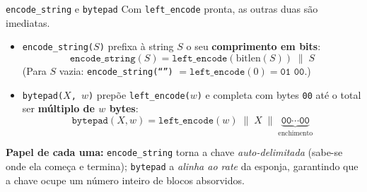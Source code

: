 \documentclass{beamer}
\begin{document}
\begin{frame}{\texttt{encode\_string} e \texttt{bytepad}}
    Com \texttt{left\_encode} pronta, as outras duas são imediatas.
    \medskip
    \begin{itemize}
        \footnotesize
        \item \texttt{encode\_string($S$)} prefixa à string $S$ o seu \textbf{comprimento em bits}:
        \[
            \texttt{encode\_string}(S) = \texttt{left\_encode}(\text{bitlen}(S)) \;\|\; S
        \]
        (Para $S$ vazia: \texttt{encode\_string(``'')} $= \texttt{left\_encode}(0) = \texttt{01 00}$.)
        \medskip
        \item \texttt{bytepad($X$, $w$)} prepõe \texttt{left\_encode($w$)} e completa com bytes \texttt{00} até o total ser \textbf{múltiplo de $w$ bytes}:
        \[
            \texttt{bytepad}(X, w) = \texttt{left\_encode}(w) \;\|\; X \;\|\; \underbrace{\texttt{00}\cdots\texttt{00}}_{\text{enchimento}}
        \]
    \end{itemize}
    \medskip
    \begin{tcolorbox}[colback=blue!5,colframe=blue!50!black,boxrule=0.5pt]
        \footnotesize
        \textbf{Papel de cada uma:} \texttt{encode\_string} torna a chave \emph{auto-delimitada} (sabe-se onde ela começa e termina); \texttt{bytepad} a \emph{alinha ao \textit{rate}} da esponja, garantindo que a chave ocupe um número inteiro de blocos absorvidos.
    \end{tcolorbox}
\end{frame}
\end{document}
